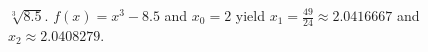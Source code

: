 {$\sqrt[3]{8.5}$.}
{$f(x)=x^3-8.5$ and $x_0=2$ yield $x_1=\frac{49}{24}\approx2.0416667$ and $x_2\approx2.0408279$.}
